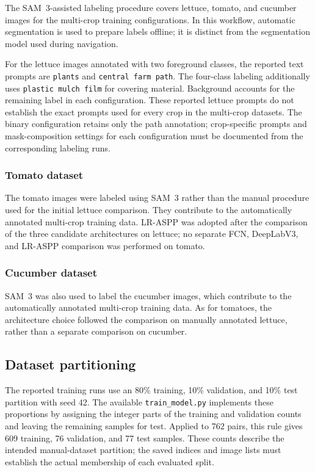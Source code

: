 The SAM~3-assisted labeling procedure covers lettuce, tomato, and
cucumber images for the multi-crop training configurations. In this
workflow, automatic segmentation is used to prepare labels offline; it
is distinct from the segmentation model used during navigation.

For the lettuce images annotated with two foreground classes, the reported
text prompts are \texttt{plants} and \texttt{central farm path}. The
four-class labeling additionally uses \texttt{plastic mulch film} for
covering material. Background accounts for the remaining label in each
configuration. These reported lettuce prompts do not establish the exact
prompts used for every crop in the multi-crop datasets. The binary
configuration retains only the path annotation; crop-specific prompts
and mask-composition settings for each configuration must be documented
from the corresponding labeling runs.

\subsubsection{Tomato dataset}
\label{subsubsec:c4_tomato}

The tomato images were labeled using SAM~3 rather than the manual
procedure used for the initial lettuce comparison. They contribute to
the automatically annotated multi-crop training data. LR-ASPP was adopted
after the comparison of the three candidate architectures on lettuce;
no separate FCN, DeepLabV3, and LR-ASPP comparison was performed on tomato.

\subsubsection{Cucumber dataset}
\label{subsubsec:c4_cucumber}

SAM~3 was also used to label the cucumber images, which contribute to
the automatically annotated multi-crop training data. As for tomatoes,
the architecture choice followed the comparison on manually annotated
lettuce, rather than a separate comparison on cucumber.

\subsection{Dataset partitioning}
\label{subsec:c4_dataset_splits}

The reported training runs use an 80\% training, 10\% validation, and
10\% test partition with seed 42. The available \texttt{train\_model.py}
implements these proportions by assigning the integer parts of the
training and validation counts and leaving the remaining samples for
test. Applied to 762 pairs, this rule gives 609 training, 76 validation,
and 77 test samples. These counts describe the intended manual-dataset
partition; the saved indices and image lists must establish the actual
membership of each evaluated split.

